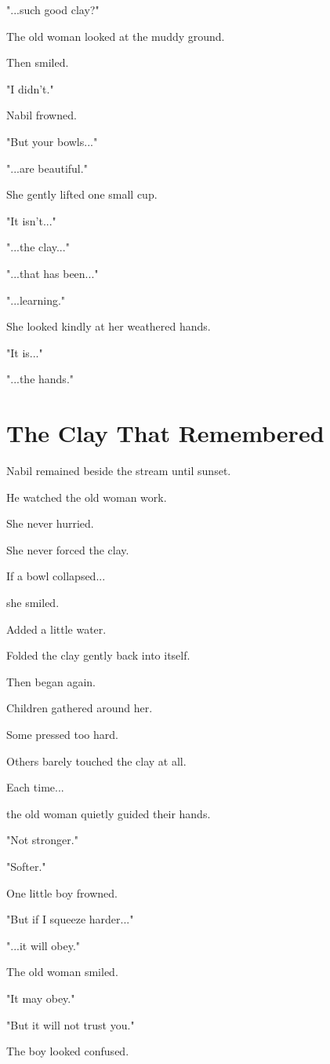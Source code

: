 \documentclass[12pt,openany]{book}
\begin{document}
"...such good clay?"

The old woman looked at the muddy ground.

Then smiled.

"I didn't."

Nabil frowned.

"But your bowls..."

"...are beautiful."

She gently lifted one small cup.

"It isn't..."

"...the clay..."

"...that has been..."

"...learning."

She looked kindly at her weathered hands.

"It is..."

"...the hands."
\section*{The Clay That Remembered}

Nabil remained beside the stream until sunset.

He watched the old woman work.

She never hurried.

She never forced the clay.

If a bowl collapsed...

she smiled.

Added a little water.

Folded the clay gently back into itself.

Then began again.

Children gathered around her.

Some pressed too hard.

Others barely touched the clay at all.

Each time...

the old woman quietly guided their hands.

"Not stronger."

"Softer."

One little boy frowned.

"But if I squeeze harder..."

"...it will obey."

The old woman smiled.

"It may obey."

"But it will not trust you."

The boy looked confused.
\end{document}
